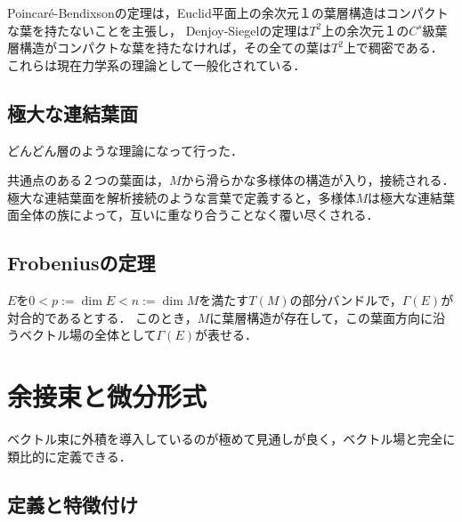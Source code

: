 \documentclass[uplatex,dvipdfmx]{jsreport}
\begin{document}
\begin{history}
    Poincaré-Bendixsonの定理は，Euclid平面上の余次元１の葉層構造はコンパクトな葉を持たないことを主張し，
    Denjoy-Siegelの定理は$T^2$上の余次元１の$C^s$級葉層構造がコンパクトな葉を持たなければ，その全ての葉は$T^2$上で稠密である．
    これらは現在力学系の理論として一般化されている．
\end{history}

\subsection{極大な連結葉面}

\begin{tcolorbox}[colframe=ForestGreen, colback=ForestGreen!10!white,breakable,colbacktitle=ForestGreen!40!white,coltitle=black,fonttitle=\bfseries\sffamily,
title=]
    どんどん層のような理論になって行った．
\end{tcolorbox}

共通点のある２つの葉面は，$M$から滑らかな多様体の構造が入り，接続される．
極大な連結葉面を解析接続のような言葉で定義すると，多様体$M$は極大な連結葉面全体の族によって，互いに重なり合うことなく覆い尽くされる．

\subsection{Frobeniusの定理}

\begin{theorem}
    $E$を$0<p:=\dim E<n:=\dim M$を満たす$T(M)$の部分バンドルで，$\Gamma(E)$が対合的であるとする．
    このとき，$M$に葉層構造が存在して，この葉面方向に沿うベクトル場の全体として$\Gamma(E)$が表せる．
\end{theorem}

\section{余接束と微分形式}

\begin{tcolorbox}[colframe=ForestGreen, colback=ForestGreen!10!white,breakable,colbacktitle=ForestGreen!40!white,coltitle=black,fonttitle=\bfseries\sffamily,
title=]
    ベクトル束に外積を導入しているのが極めて見通しが良く，ベクトル場と完全に類比的に定義できる．
\end{tcolorbox}

\subsection{定義と特徴付け}
\end{document}
